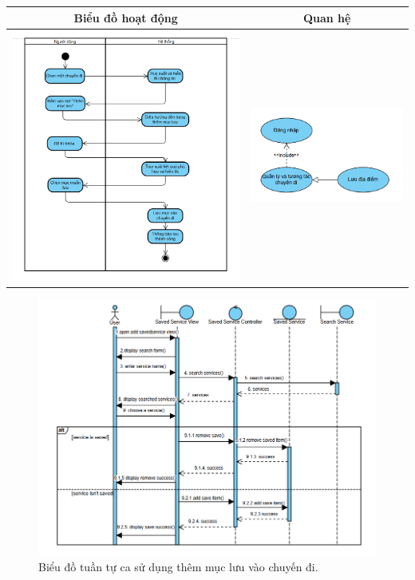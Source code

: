 \noindent 
\begin{tabular}{| c | c |}
    \hline
    \textbf{Biểu đồ hoạt động} & \textbf{Quan hệ} \\ 
    \hline
    \includegraphics[width=0.5\linewidth]{figures/c3/3-3-12-ad.png} 
    & 
    \includegraphics[width=0.45\linewidth]{figures/c3/3-3-12-rd.png} \\ 
    \hline
\end{tabular}

\vspace{0.8cm}

\begin{figure}[H]
    \centering  
    \includegraphics[width=1\textwidth]{figures/c3/3-3-12-sd.png}
    \caption{Biểu đồ tuần tự ca sử dụng thêm mục lưu vào chuyến đi.}
    \label{fig:3-3-12-sequence-diagram}
\end{figure}
